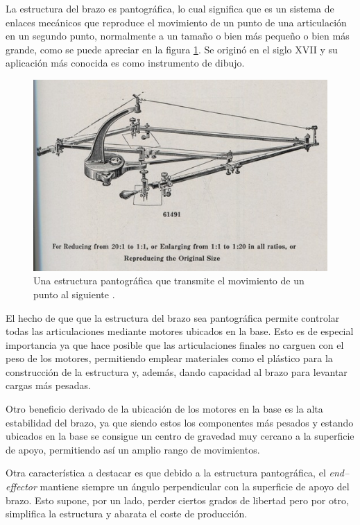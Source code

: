 La estructura del brazo es pantográfica, lo cual significa que es un sistema de enlaces mecánicos que reproduce el movimiento de un punto de una articulación en un segundo punto, normalmente a un tamaño o bien más pequeño o bien más grande, como se puede apreciar en la figura \ref{fig:estrucutra_pantografica}. Se originó en el siglo XVII y su aplicación más conocida es como instrumento de dibujo.

\begin{figure}[H]
    \centering
    \includegraphics[width=.7\linewidth]{pictures/link-to-elliott-p149-suspended-pantograph-sf0.jpg}
    \caption{Una estructura pantográfica que transmite el movimiento de un punto al siguiente \cite{PantographContext}.}
    \label{fig:estrucutra_pantografica}
\end{figure}

El hecho de que que la estructura del brazo sea pantográfica permite controlar todas las articulaciones mediante motores ubicados en la base. Esto es de especial importancia ya que hace posible que las articulaciones finales no carguen con el peso de los motores, permitiendo emplear materiales como el plástico para la construcción de la estructura y, además, dando capacidad al brazo para levantar cargas más pesadas.

Otro beneficio derivado de la ubicación de los motores en la base es la alta estabilidad del brazo, ya que siendo estos los componentes más pesados y estando ubicados en la base se consigue un centro de gravedad muy cercano a la superficie de apoyo, permitiendo así un amplio rango de movimientos.

Otra característica a destacar es que debido a la estructura pantográfica, el \textit{end--effector} mantiene siempre un ángulo perpendicular con la superficie de apoyo del brazo. Esto supone, por un lado, perder ciertos grados de libertad pero por otro, simplifica la estructura y abarata el coste de producción.